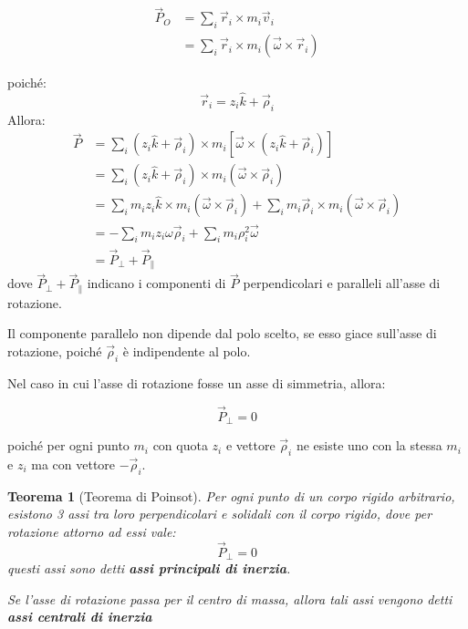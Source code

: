\documentclass[11pt, a4paper, openright]{book}
\theoremstyle{plain}
\newtheorem{theorem}{Teorema}[section]
\theoremstyle{definition}
\begin{document}
\begin{align}
    \vec{P}_O & = \sum_i \vec{r}_i \times m_i \vec{v}_i \\
    & = \sum_i \vec{r}_i \times m_i (\vec{\omega} \times \vec{r}_i)
\end{align}

poiché:
\begin{equation}
    \vec{r}_i = z_i \hat{k} + \vec{\rho}_i
\end{equation}
Allora:
\begin{align}
    \vec{P} & = \sum_i (z_i \hat{k} + \vec{\rho}_i) \times m_i [\vec{\omega} \times (z_i \hat{k} + \vec{\rho}_i)] \\
    & = \sum_i (z_i \hat{k} + \vec{\rho}_i) \times m_i (\vec{\omega} \times \vec{\rho}_i) \\
    & = \sum_i m_i z_i \hat{k} \times m_i (\vec{\omega} \times \vec{\rho}_i) + \sum_i m_i \vec{\rho}_i \times m_i (\vec{\omega} \times \vec{\rho}_i) \\
    & = -\sum_i m_i z_i \omega \vec{\rho}_i + \sum_i m_i \rho^2_i \vec{\omega} \\
    & = \vec{P}_\perp + \vec{P}_\parallel
\end{align}
dove $\vec{P}_\perp + \vec{P}_\parallel$ indicano i componenti di $\vec{P}$ perpendicolari e paralleli all'asse di rotazione.

Il componente parallelo non dipende dal polo scelto, se esso giace sull'asse di rotazione, poiché $\vec{\rho}_i$ è indipendente al polo.

Nel caso in cui l'asse di rotazione fosse un asse di simmetria, allora:

\begin{equation}
    \vec{P}_\perp = 0
\end{equation}

poiché per ogni punto $m_i$ con quota $z_i$ e vettore $\vec{\rho}_i$ ne esiste uno con la stessa $m_i$ e $z_i$ ma con vettore $-\vec{\rho}_i$.

\begin{theorem}[Teorema di Poinsot]
    Per ogni punto di un corpo rigido arbitrario, esistono 3 assi tra loro perpendicolari e solidali con il corpo rigido, dove per rotazione attorno ad essi vale:
    \begin{equation}
        \vec{P}_\perp = 0
    \end{equation} 
    questi assi sono detti \textbf{assi principali di inerzia}.

    Se l'asse di rotazione passa per il centro di massa, allora tali assi vengono detti \textbf{assi centrali di inerzia}
\end{theorem}
\end{document}
